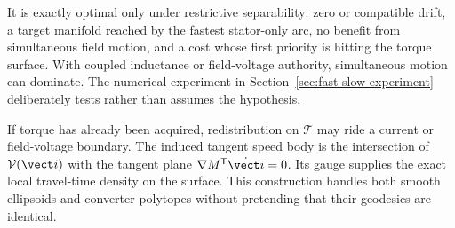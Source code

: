 It is exactly optimal only under restrictive separability: zero or compatible
drift, a target manifold reached by the fastest stator-only arc, no benefit
from simultaneous field motion, and a cost whose first priority is hitting
the torque surface.  With coupled inductance or field-voltage authority,
simultaneous motion can dominate.  The numerical experiment in
Section~\ref{sec:fast-slow-experiment} deliberately tests rather than assumes
the hypothesis.



If torque has already been acquired, redistribution on \(\mathcal T\) may
ride a current or field-voltage boundary.  The induced tangent speed body is
the intersection of \(\mathcal V(\vect i)\) with the tangent plane
\(\nabla M^{\mathsf T}\dot{\vect i}=0\).  Its gauge supplies the exact local
travel-time density on the surface.  This construction handles both smooth
ellipsoids and converter polytopes without pretending that their geodesics
are identical.
